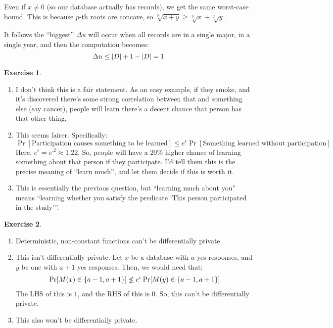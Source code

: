 \documentclass{article}
\theoremstyle{definition}
\newtheorem{exercise}{Exercise}[section]
\begin{document}
\begin{itemize}
Even if $x\neq 0$ (so our database actually has records), we get the same worst-case bound.
This is because $p$-th roots are concave, so $\sqrt[p]{x+y}\geq\sqrt[p]{x}+\sqrt[p]{y}$.

It follows the ``biggest'' $\Delta u$ will occur when all records are in a single major, in a single year, and then the computation becomes:
\begin{equation}
\Delta u \leq \abs{D}+1 - \abs{D} = 1
\end{equation}

\begin{exercise}
\begin{enumerate}
\item I don't think this is a fair statement.
As an easy example, if they smoke, and it's discovered there's some strong correlation between that and something else (say cancer), people will learn there's a decent chance that person has that other thing.
\item This seems fairer.
Specifically:
\begin{equation}
\Pr[\text{Participation causes something to be learned}] \leq e^\epsilon \Pr[\text{Something learned without participation}]
\end{equation}
Here, $e^\epsilon = e^{.2}\approx 1.22$.
So, people will have a $20\%$ higher chance of learning something about that person if they participate.
I'd tell them this is the precise meaning of ``learn much'', and let them decide if this is worth it.
\item This is essentially the previous question, but ``learning much about you'' means ``learning whether you satisfy the predicate `This person participated in the study'''.
\end{enumerate}
\end{exercise}
\begin{exercise}
\begin{enumerate}
\item Deterministic, non-constant functions can't be differentially private.
\item This isn't differentially private.
Let $x$ be a database with $a$ yes responses, and $y$ be one with $a+1$ yes responses.
Then, we would need that:
\begin{align*}
\Pr[M(x)\in\Bqty{a-1,a+1}]\not\leq e^\epsilon\Pr[M(y)\in\Bqty{a-1,a+1}]
\end{align*}
The LHS of this is $1$, and the RHS of this is $0$.
So, this can't be differentially private.
\item This also won't be differentially private.

\end{enumerate}
\end{exercise}
\end{itemize}
\end{document}
